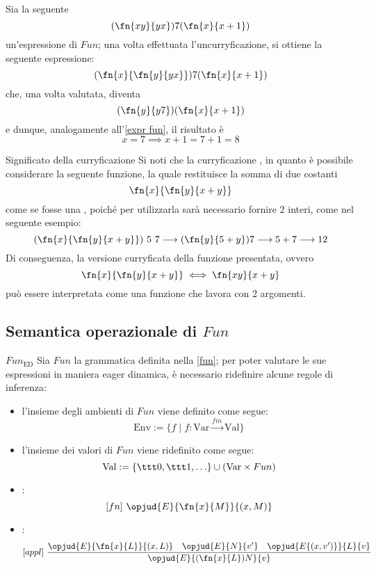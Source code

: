 \documentclass[a4paper, 12pt]{report}
\begin{document}
    \begin{example}[Curryficazioni]
        Sia la seguente $$(\fn{xy}{yx})7(\fn{x}{x+1})$$ un'espressione di $Fun$; una volta effettuata l'uncurryficazione, si ottiene la seguente espressione: $$(\fn{x}{\fn{y}{yx}})7(\fn{x}{x+1})$$ che, una volta valutata, diventa $$(\fn{y}{y7})(\fn{x}{x+1})$$ e dunque, analogamente all'\cref{expr fun}, il risultato è $$x= 7 \implies x+1 = 7 + 1= 8$$
    \end{example}

    \begin{framedobs}{Significato della curryficazione}
        Si noti che la curryficazione , in quanto è possibile considerare la seguente funzione, la quale restituisce la somma di due costanti $$\fn{x}{\fn{y}{x + y}}$$ come se fosse una , poiché per utilizzarla sarà necessario fornire 2 interi, come nel seguente esempio: $$(\fn{x}{\fn{y}{x + y}}) \ 5 \ 7 \longrightarrow (\fn{y}{5 + y})7 \longrightarrow 5 + 7 \longrightarrow 12$$ Di conseguenza, la versione curryficata della funzione presentata, ovvero $$\fn{x}{\fn{y}{x + y}} \iff \fn{xy}{x + y}$$ può essere interpretata come una funzione che lavora con 2 argomenti.
    \end{framedobs}

    \subsection{Semantica operazionale di $Fun$}

    \begin{framedprop}{$Fun_\mathrm{ED}$}
        Sia $Fun$ la grammatica definita nella \cref{fun}; per poter valutare le sue espressioni in maniera eager dinamica, è necessario ridefinire alcune regole di inferenza:

        \begin{itemize}
            \item l'insieme degli ambienti di $Fun$ viene definito come segue: $$\mathrm{Env} := \{f \mid f : \mathrm{Var} \xrightarrow{fin} \mathrm{Val}\}$$
            \item l'insieme dei valori di $Fun$ viene ridefinito come segue: $$\mathrm{Val} := \{ \ttt 0, \ttt 1 , \ldots \} \cup (\mathrm{Var} \times Fun)$$                   \item {}: $$[fn] \ \opjud{E}{\fn{x}{M}}{(x,M)}$$
            \item {}: $$[appl] \ \dfrac{\opjud{E}{\fn{x}{L}}{(x,L)} \quad \opjud{E}{N}{v'} \quad \opjud{E\{(x,v')\}}{L}{v}}{\opjud{E}{(\fn{x}{L})N}{v}}$$
        \end{itemize}
    \end{framedprop}
\end{document}
